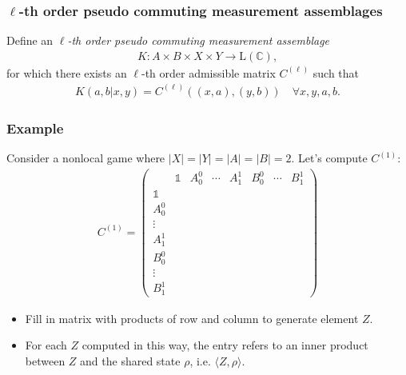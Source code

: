 \documentclass{beamer}
\def\I{\mathds{1}}
\newcommand{\abs}[1]{\lvert #1 \rvert}
\newcommand{\ip}[2]{\langle #1 , #2\rangle}
\def\complex{\mathbb{C}}
\newcommand{\setft}[1]{\mathrm{#1}}
\newcommand{\Lin}{\setft{L}}
\begin{document}
\begin{frame}
	\frametitle{$\ell$-th order pseudo commuting measurement assemblages}
	Define an \emph{$\ell$-th order pseudo commuting measurement assemblage} 
	\begin{align*}
		K: A \times B \times X \times Y \rightarrow \Lin(\complex),
	\end{align*}
	for which there exists an $\ell$-th order admissible matrix $C^{(\ell)}$ such that 
	\begin{align*}
		K(a,b|x,y) = C^{(\ell)}((x,a),(y,b)) \quad \forall x,y,a,b. 
	\end{align*}
\end{frame}

\begin{frame}
	\frametitle{Example}
	Consider a nonlocal game where $\abs{X} = \abs{Y} = \abs{A} = \abs{B} = 2$. Let's compute $C^{(1)}$:
	\[
\begin{aligned}
C^{(1)} =
\left(
\begin{array}{c||cccc|ccc}
 & \I & A_0^0 & \cdots & A_1^1 & B_0^0 & \cdots & B_1^1 \\
\hline\hline 
\I & & & & & & & \\
A_0^0 & & & & & & &  \\
\vdots & & & & & & & \\
A_1^1 & & & & & & & \\
\hline 
B_0^0 & & & & & & & \\
\vdots & & & & & & & \\
B_1^1 & & & & & & & 
\end{array}
\right) 
\end{aligned}
\]

\begin{itemize}
	\item Fill in matrix with products of row and column to generate element $Z$. 
	\item For each $Z$ computed in this way, the entry refers to an inner product between $Z$ and the shared state $\rho$, i.e. $\ip{Z}{\rho}$. 
\end{itemize}

\end{frame}
\end{document}
